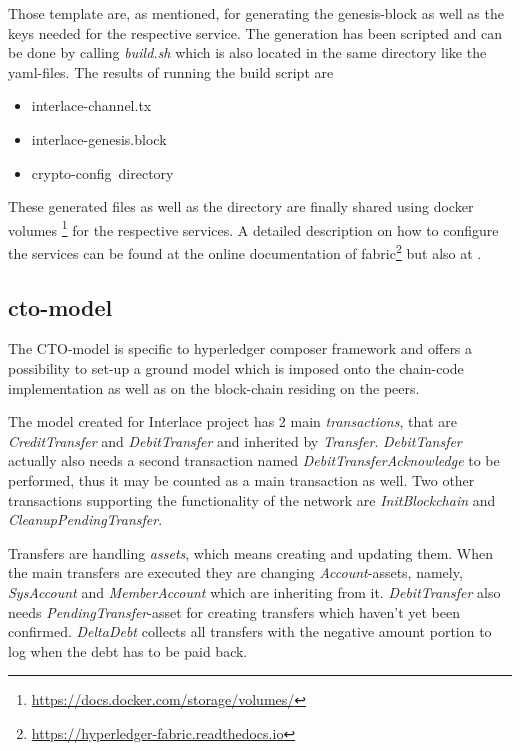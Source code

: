 Those template are, as mentioned, for generating the genesis-block as well as the keys needed for the respective service. The generation has been scripted and can be done by calling \textit{build.sh} which is also located in the same directory like the yaml-files. The results of running the build script are

\begin{itemize}
	\item interlace-channel.tx
	\item interlace-genesis.block
	\item crypto-config\ directory
\end{itemize}

These generated files as well as the directory are finally shared using docker volumes \footnote{\url{https://docs.docker.com/storage/volumes/}} for the respective services. A detailed description on how to configure the services can be found at the online documentation of fabric\footnote{\url{https://hyperledger-fabric.readthedocs.io}} but also at \cite{HandsOnBlockchainHyperledger2018}.

\subsection{cto-model}
\label{sec:cto-model}

The CTO-model is specific to hyperledger composer framework and offers a possibility to set-up a ground model which is imposed onto the chain-code implementation as well as on the block-chain residing on the peers. 

The model created for Interlace project has 2 main \textit{transactions}, that are \textit{CreditTransfer} and \textit{DebitTransfer} and inherited by \textit{Transfer}. \textit{DebitTansfer} actually also needs a second transaction named \textit{DebitTransferAcknowledge} to be performed, thus it may be counted as a main transaction as well. Two other transactions supporting the functionality of the network are \textit{InitBlockchain} and \textit{CleanupPendingTransfer}.

Transfers are handling \textit{assets}, which means creating and updating them. When the main transfers are executed they are changing \textit{Account}-assets, namely, \textit{SysAccount} and \textit{MemberAccount} which are inheriting from it. \textit{DebitTransfer} also needs \textit{PendingTransfer}-asset for creating transfers which haven't yet been confirmed. \textit{DeltaDebt} collects all transfers with the negative amount portion to log when the debt has to be paid back.

